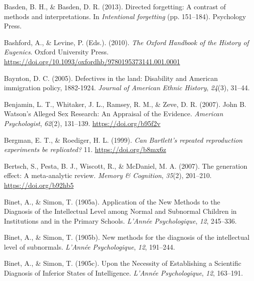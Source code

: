 \documentclass[
  oneside,
  12pt]{crumpbook}
\newlength{\cslhangindent}
\newlength{\cslentryspacingunit} %
\newenvironment{CSLReferences}[2] %
 {%
  \setlength{\parindent}{0pt}
  \ifodd #1
  \let\oldpar\par
  \def\par{\hangindent=\cslhangindent\oldpar}
  \fi
  \setlength{\parskip}{#2\cslentryspacingunit}
 }%
 {}
\begin{document}
\begin{CSLReferences}{1}{0}
\leavevmode{}%
Basden, B. H., \& Basden, D. R. (2013). Directed forgetting: {A} contrast of methods and interpretations. In \emph{Intentional forgetting} (pp. 151--184). {Psychology Press}.

\leavevmode{}%
Bashford, A., \& Levine, P. (Eds.). (2010). \emph{The {Oxford Handbook} of the {History} of {Eugenics}}. {Oxford University Press}. \url{https://doi.org/10.1093/oxfordhb/9780195373141.001.0001}

\leavevmode{}%
Baynton, D. C. (2005). Defectives in the land: {Disability} and {American} immigration policy, 1882-1924. \emph{Journal of American Ethnic History}, \emph{24}(3), 31--44.

\leavevmode{}%
Benjamin, L. T., Whitaker, J. L., Ramsey, R. M., \& Zeve, D. R. (2007). John {B}. {Watson}'s {Alleged Sex Research}: {An Appraisal} of the {Evidence}. \emph{American Psychologist}, \emph{62}(2), 131--139. \url{https://doi.org/b95f2v}

\leavevmode{}%
Bergman, E. T., \& Roediger, H. L. (1999). \emph{Can {Bartlett}'s repeated reproduction experiments be replicated?} 11. \url{https://doi.org/b8mx6z}

\leavevmode{}%
Bertsch, S., Pesta, B. J., Wiscott, R., \& McDaniel, M. A. (2007). The generation effect: {A} meta-analytic review. \emph{Memory \& Cognition}, \emph{35}(2), 201--210. \url{https://doi.org/b92hb5}

\leavevmode{}%
Binet, A., \& Simon, T. (1905a). Application of the {New Methods} to the {Diagnosis} of the {Intellectual Level} among {Normal} and {Subnormal Children} in {Institutions} and in the {Primary Schools}. \emph{L'Année Psychologique}, \emph{12}, 245--336.

\leavevmode{}%
Binet, A., \& Simon, T. (1905b). New methods for the diagnosis of the intellectual level of subnormals. \emph{L'Année Psychologique}, \emph{12}, 191--244.

\leavevmode{}%
Binet, A., \& Simon, T. (1905c). Upon the {Necessity} of {Establishing} a {Scientific Diagnosis} of {Inferior States} of {Intelligence}. \emph{L'Année Psychologique}, \emph{12}, 163--191.


\end{CSLReferences}
\end{document}
